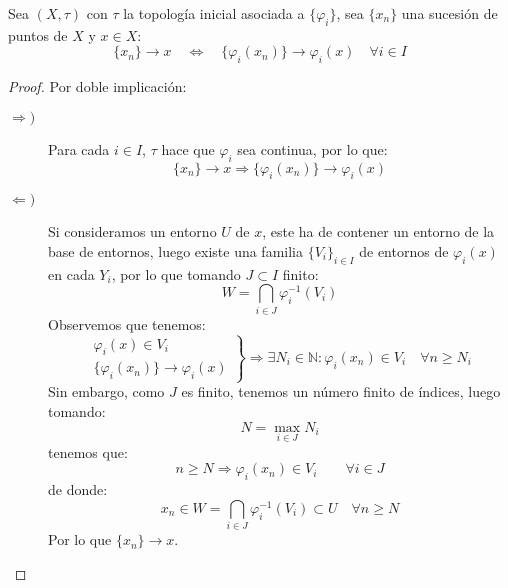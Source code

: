 \begin{prop}
    Sea $(X,\tau)$ con $\tau$ la topología inicial asociada a $\{\varphi_i\}$, sea $\{x_n\}$ una sucesión de puntos de $X$ y $x\in X$:
    \begin{equation*}
        \{x_n\}\to x \quad \Longleftrightarrow \quad  \{\varphi_i(x_n)\} \to \varphi_i(x) \quad \forall i \in I
    \end{equation*}
    \begin{proof}
        Por doble implicación:
        \begin{description}
            \item [$\Longrightarrow )$] Para cada $i \in I$, $\tau$ hace que $\varphi_i$ sea continua, por lo que:
                \begin{equation*}
                    \{x_n\} \to x \Longrightarrow \{\varphi_i(x_n)\} \to \varphi_i(x)
                \end{equation*}
            \item [$\Longleftarrow )$] Si consideramos un entorno $U$ de $x$, este ha de contener un entorno de la base de entornos, luego existe una familia $\{V_i\}_{i \in I}$ de entornos de $\varphi_i(x)$ en cada $Y_i$, por lo que tomando $J\subset I$ finito:
                \begin{equation*}
                    W = \bigcap_{i \in J}\varphi_i^{-1}(V_i)
                \end{equation*}
                Observemos que tenemos:
                \begin{equation*}
                    \left.\begin{array}{l}
                        \varphi_i(x) \in V_i \\
                        \{\varphi_i(x_n)\} \to \varphi_i(x)
                    \end{array}\right\} \Longrightarrow \exists N_i \in \mathbb{N} : \varphi_i(x_n)\in V_i \quad \forall n\geq N_i
                \end{equation*}
                Sin embargo, como $J$ es finito, tenemos un número finito de índices, luego tomando:
                \begin{equation*}
                    N = \max_{i \in J}N_i
                \end{equation*}
                tenemos que:
                \begin{equation*}
                    n\geq N \Longrightarrow \varphi_i(x_n) \in V_i \qquad \forall i \in J
                \end{equation*}
                de donde:
                \begin{equation*}
                    x_n \in W = \bigcap_{i \in J}\varphi_i^{-1}(V_i) \subset U \quad \forall n\geq N
                \end{equation*}
                Por lo que $\{x_n\}\to x$.
        \end{description}
    \end{proof}
\end{prop}

